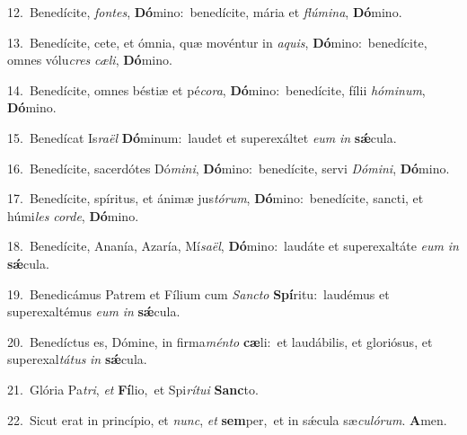 {\numbfont\textcolor{\numbcolor}{12.}}~Benedícite, \textit{fon}\-\textit{tes}, \textbf{Dó}\-mino:~\star benedícite, mária et \textit{flú}\-\textit{mi}\textit{na}, \textbf{Dó}\-mino.\par
{\numbfont\textcolor{\numbcolor}{13.}}~Benedícite, cete, et ómnia, quæ movéntur in \textit{a}\-\textit{quis}, \textbf{Dó}\-mino:~\star benedícite, omnes vólu\textit{cres} \textit{cæ}\-\textit{li}, \textbf{Dó}\-mino.\par
{\numbfont\textcolor{\numbcolor}{14.}}~Benedícite, omnes béstiæ et pé\-\textit{co}\-\textit{ra}, \textbf{Dó}\-mino:~\star benedícite, fílii \textit{hó}\-\textit{mi}\textit{num}, \textbf{Dó}\-mino.\par
{\numbfont\textcolor{\numbcolor}{15.}}~Benedícat Is\-\textit{ra}\-\textit{ël} \textbf{Dó}\-minum:~\star laudet et superexáltet \textit{e}\-\textit{um} \textit{in} \textbf{sǽ}\-cula.\par
{\numbfont\textcolor{\numbcolor}{16.}}~Benedícite, sacerdótes Dó\-\textit{mi}\-\textit{ni}, \textbf{Dó}\-mino:~\star benedícite, servi \textit{Dó}\-\textit{mi}\textit{ni}, \textbf{Dó}\-mino.\par
{\numbfont\textcolor{\numbcolor}{17.}}~Benedícite, spíritus, et ánimæ jus\-\textit{tó}\-\textit{rum}, \textbf{Dó}\-mino:~\star benedícite, sancti, et húmi\textit{les} \textit{cor}\-\textit{de}, \textbf{Dó}\-mino.\par
{\numbfont\textcolor{\numbcolor}{18.}}~Benedícite, Ananía, Azaría, Mí\-\textit{sa}\-\textit{ël}, \textbf{Dó}\-mino:~\star laudáte et superexaltáte \textit{e}\-\textit{um} \textit{in} \textbf{sǽ}\-cula.\par
{\numbfont\textcolor{\numbcolor}{19.}}~Benedicámus Patrem et Fílium cum \textit{Sanc}\-\textit{to} \textbf{Spí}\-ritu:~\star laudémus et superexaltémus \textit{e}\-\textit{um} \textit{in} \textbf{sǽ}\-cula.\par
{\numbfont\textcolor{\numbcolor}{20.}}~Benedíctus es, Dómine, in firma\-\textit{mén}\-\textit{to} \textbf{cæ}\-li:~\star et laudábilis, et gloriósus, et superexal\-\textit{tá}\-\textit{tus} \textit{in} \textbf{sǽ}\-cula.\par
{\numbfont\textcolor{\numbcolor}{21.}}~Glória Pa\-\textit{tri}\-, \textit{et} \textbf{Fí}\-lio,~\star et Spi\-\textit{rí}\-\textit{tu}\textit{i} \textbf{Sanc}\-to.\par
{\numbfont\textcolor{\numbcolor}{22.}}~Sicut erat in princípio, et \textit{nunc}\-, \textit{et} \textbf{sem}\-per,~\star et in sǽcula sæ\-\textit{cu}\-\textit{ló}\textit{rum}. \textbf{A}\-men.\par
